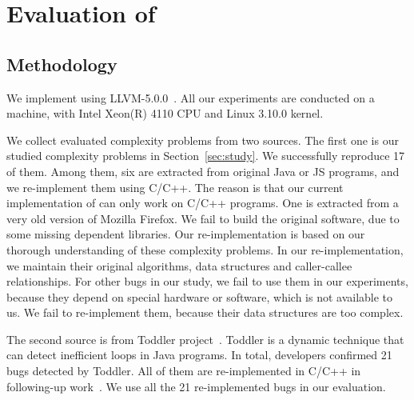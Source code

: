\section{Evaluation of \Tool}
\label{sec:eva}

\subsection{Methodology}

We implement \Tool using LLVM-5.0.0~\cite{llvm}. 
All our experiments are conducted on a machine, 
with Intel Xeon(R) 4110 CPU and Linux 3.10.0 kernel.


We collect evaluated complexity problems from two sources. 
The first one is our studied complexity problems in Section~\ref{sec:study}.
We successfully reproduce 17 of them. 
Among them, six are extracted from original Java or JS programs, 
and we re-implement them using C/C++.
The reason is that our current implementation of \Tool can only work on C/C++ programs.
One is extracted from a very old version of Mozilla Firefox. 
We fail to build the original software, 
due to some missing dependent libraries. 
Our re-implementation is based on our thorough understanding of these complexity problems.
In our re-implementation, we maintain their original algorithms, 
data structures and caller-callee relationships. 
For other bugs in our study, 
we fail to use them in our experiments, because they depend on special hardware 
or software, which is not available to us. 
We fail to re-implement them, because their data structures are too complex. 


The second source is from Toddler project~\cite{Alabama}. 
Toddler is a dynamic technique that can detect inefficient loops in Java programs.
In total, developers confirmed 21 bugs detected by Toddler. 
All of them are re-implemented in C/C++ 
in following-up work~\cite{ldoctor}.
We use all the 21 re-implemented bugs in our evaluation.  


